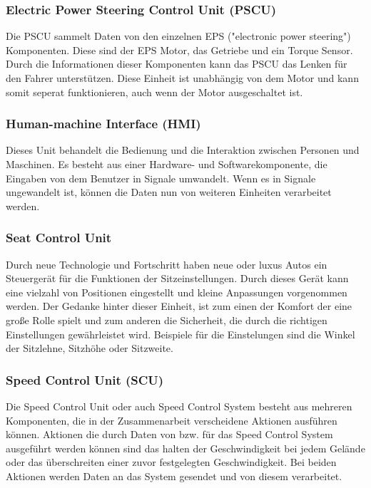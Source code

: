         \subsubsection{Electric Power Steering Control Unit (PSCU)}
        Die PSCU sammelt Daten von den einzelnen EPS ("electronic power steering") Komponenten. Diese sind der EPS Motor,
        das Getriebe und ein Torque Sensor. Durch die Informationen dieser Komponenten kann das PSCU das Lenken für den
        Fahrer unterstützen. Diese Einheit ist unabhängig von dem Motor und kann somit seperat funktionieren, auch wenn
        der Motor ausgeschaltet ist.

        \subsubsection{Human-machine Interface (HMI)}
        Dieses Unit behandelt die Bedienung und die Interaktion zwischen Personen und Maschinen. Es besteht aus einer
        Hardware- und Softwarekomponente, die Eingaben von dem Benutzer in Signale umwandelt. Wenn es in Signale
        ungewandelt ist, können die Daten nun von weiteren Einheiten verarbeitet werden.

        \subsubsection{Seat Control Unit}
        Durch neue Technologie und Fortschritt haben neue oder luxus Autos ein Steuergerät für die Funktionen der Sitzeinstellungen.
        Durch dieses Gerät kann eine vielzahl von Positionen eingestellt und kleine Anpassungen vorgenommen werden.
        Der Gedanke hinter dieser Einheit, ist zum einen der Komfort der eine große Rolle spielt und zum anderen die Sicherheit,
        die durch die richtigen Einstellungen gewährleistet wird. Beispiele für die Einstelungen sind die Winkel der Sitzlehne,
        Sitzhöhe oder Sitzweite. 

        \subsubsection{Speed Control Unit (SCU)}
        Die Speed Control Unit oder auch Speed Control System besteht aus mehreren Komponenten, die in der Zusammenarbeit
        verscheidene Aktionen ausführen können. Aktionen die durch Daten von bzw. für das Speed Control System ausgeführt
        werden können sind das halten der Geschwindigkeit bei jedem Gelände oder das überschreiten einer zuvor festgelegten
        Geschwindigkeit. Bei beiden Aktionen werden Daten an das System gesendet und von diesem verarbeitet.

